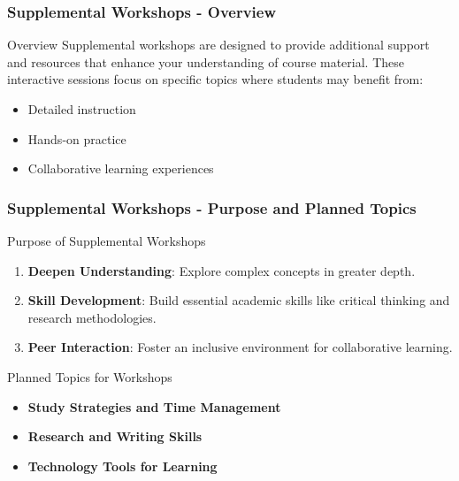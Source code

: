 \documentclass[aspectratio=169]{beamer}
\begin{document}
\begin{frame}[fragile]
  \frametitle{Supplemental Workshops - Overview}
  \begin{block}{Overview}
    Supplemental workshops are designed to provide additional support and resources that enhance your understanding of course material. These interactive sessions focus on specific topics where students may benefit from:
    \begin{itemize}
      \item Detailed instruction
      \item Hands-on practice
      \item Collaborative learning experiences
    \end{itemize}
  \end{block}
\end{frame}

\begin{frame}[fragile]
  \frametitle{Supplemental Workshops - Purpose and Planned Topics}
  \begin{block}{Purpose of Supplemental Workshops}
    \begin{enumerate}
      \item \textbf{Deepen Understanding}: Explore complex concepts in greater depth.
      \item \textbf{Skill Development}: Build essential academic skills like critical thinking and research methodologies.
      \item \textbf{Peer Interaction}: Foster an inclusive environment for collaborative learning.
    \end{enumerate}
  \end{block}
  
  \begin{block}{Planned Topics for Workshops}
    \begin{itemize}
      \item \textbf{Study Strategies and Time Management}
      \item \textbf{Research and Writing Skills}
      \item \textbf{Technology Tools for Learning}
    \end{itemize}
  \end{block}
\end{frame}
\end{document}
